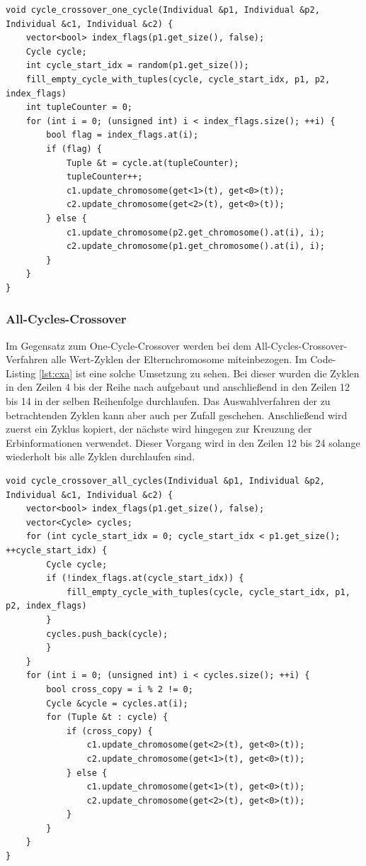 \begin{minipage}{\linewidth}
\begin{lstlisting}[caption={One-Cycle-Crossover}, firstnumber=1, captionpos=b, label=lst:cxo]
void cycle_crossover_one_cycle(Individual &p1, Individual &p2, Individual &c1, Individual &c2) {
	vector<bool> index_flags(p1.get_size(), false);
	Cycle cycle;
	int cycle_start_idx = random(p1.get_size());
	fill_empty_cycle_with_tuples(cycle, cycle_start_idx, p1, p2, index_flags)
	int tupleCounter = 0;
	for (int i = 0; (unsigned int) i < index_flags.size(); ++i) {
		bool flag = index_flags.at(i);
		if (flag) {
			Tuple &t = cycle.at(tupleCounter);
			tupleCounter++;
			c1.update_chromosome(get<1>(t), get<0>(t));
			c2.update_chromosome(get<2>(t), get<0>(t));
		} else {
 			c1.update_chromosome(p2.get_chromosome().at(i), i);
			c2.update_chromosome(p1.get_chromosome().at(i), i);
		}
	}
}
\end{lstlisting}
\end{minipage}

\subsubsection{All-Cycles-Crossover}
Im Gegensatz zum One-Cycle-Crossover werden bei dem All-Cycles-Crossover-Verfahren alle Wert-Zyklen der Elternchromosome miteinbezogen.
Im Code-Listing \ref{lst:cxa} ist eine solche Umsetzung zu sehen. Bei dieser wurden die Zyklen in den Zeilen 4 bis der Reihe nach aufgebaut und anschließend in den Zeilen 12 bis 14 in der selben Reihenfolge durchlaufen. 
Das Auswahlverfahren der zu betrachtenden Zyklen kann aber auch per Zufall geschehen. Anschließend wird zuerst ein Zyklus kopiert, der nächste wird hingegen zur Kreuzung der Erbinformationen verwendet. Dieser Vorgang wird in den Zeilen 12 bis 24 solange wiederholt bis alle Zyklen durchlaufen sind.

\begin{minipage}{\linewidth}
\begin{lstlisting}[caption={All-Cycles-Crossover}, firstnumber=1, captionpos=b, label=lst:cxa]
void cycle_crossover_all_cycles(Individual &p1, Individual &p2, Individual &c1, Individual &c2) {
	vector<bool> index_flags(p1.get_size(), false);
	vector<Cycle> cycles;
	for (int cycle_start_idx = 0; cycle_start_idx < p1.get_size(); ++cycle_start_idx) {
		Cycle cycle;
		if (!index_flags.at(cycle_start_idx)) {
			fill_empty_cycle_with_tuples(cycle, cycle_start_idx, p1, p2, index_flags)
		}
		cycles.push_back(cycle);
		}
	}
	for (int i = 0; (unsigned int) i < cycles.size(); ++i) {
		bool cross_copy = i % 2 != 0;
		Cycle &cycle = cycles.at(i);
		for (Tuple &t : cycle) {
			if (cross_copy) {
				c1.update_chromosome(get<2>(t), get<0>(t));
				c2.update_chromosome(get<1>(t), get<0>(t));
			} else {
				c1.update_chromosome(get<1>(t), get<0>(t));	
 				c2.update_chromosome(get<2>(t), get<0>(t));
			}
		}
	}
}

\end{lstlisting}
\end{minipage}
